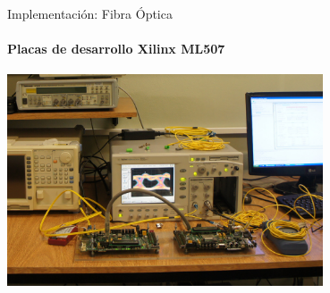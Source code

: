 \documentclass[aspectratio=169]{beamer}
\begin{document}
\begin{frame}{Implementación: Fibra Óptica}

\framesubtitle{Placas de desarrollo Xilinx ML507}
  \centering
  \includegraphics[width=0.7\textwidth]{graphs/fpga.jpg} 

\end{frame}
\end{document}
